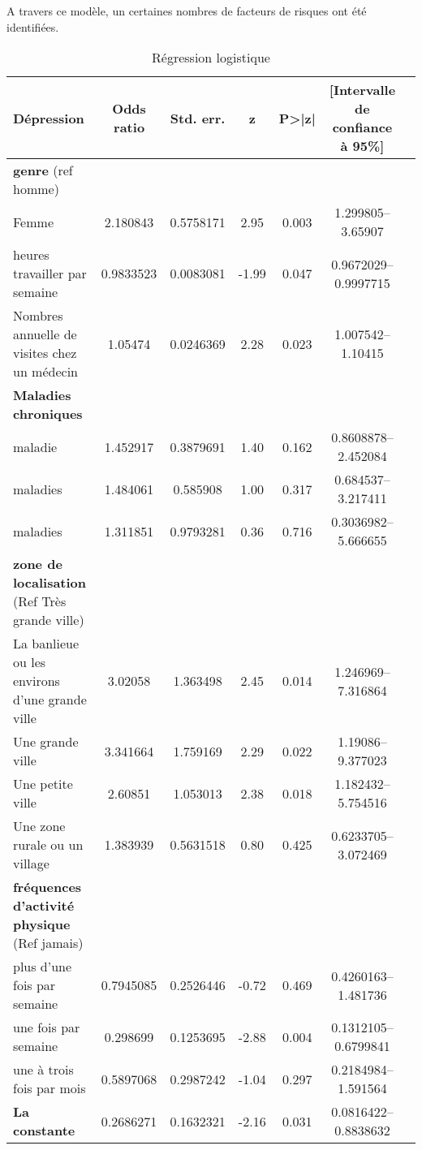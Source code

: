 \documentclass[a4paper]{article}
\begin{document}
A travers ce modèle, un certaines nombres de facteurs de risques ont été identifiées. 
\begin{table}[ht]
	\centering
	\caption{Régression logistique}
	\begin{tabular}{lcccccc}
		\toprule
		\textbf{Dépression} & \textbf{Odds ratio} & \textbf{Std. err.} & \textbf{z} & \textbf{P>|z|} & \textbf{[Intervalle de confiance à 95\%]} \\
		\midrule
		\textbf{genre} (ref homme) & & & & & \\
		\quad Femme & 2.180843 & 0.5758171 & 2.95 & 0.003 & 1.299805--3.65907 \\
		heures travailler par semaine & 0.9833523 & 0.0083081 & -1.99 & 0.047 & 0.9672029--0.9997715 \\
		Nombres annuelle de visites chez un médecin & 1.05474 & 0.0246369 & 2.28 & 0.023 & 1.007542--1.10415 \\
		\textbf{Maladies chroniques} & & & & & \\
		\quad 1 maladie & 1.452917 & 0.3879691 & 1.40 & 0.162 & 0.8608878--2.452084 \\
		\quad 2 maladies & 1.484061 & 0.585908 & 1.00 & 0.317 & 0.684537--3.217411 \\
		\quad 3 maladies & 1.311851 & 0.9793281 & 0.36 & 0.716 & 0.3036982--5.666655 \\
		\textbf{zone de localisation} (Ref Très grande ville) & & & & & \\
		\quad La banlieue ou les environs d'une grande ville & 3.02058 & 1.363498 & 2.45 & 0.014 & 1.246969--7.316864 \\
		\quad Une grande ville & 3.341664 & 1.759169 & 2.29 & 0.022 & 1.19086--9.377023 \\
		\quad Une petite ville & 2.60851 & 1.053013 & 2.38 & 0.018 & 1.182432--5.754516 \\
		\quad Une zone rurale ou un village & 1.383939 & 0.5631518 & 0.80 & 0.425 & 0.6233705--3.072469 \\
		\textbf{fréquences d'activité physique} (Ref jamais) & & & & & \\
		\quad plus d'une fois par semaine & 0.7945085 & 0.2526446 & -0.72 & 0.469 & 0.4260163--1.481736 \\
		\quad une fois par semaine & 0.298699 & 0.1253695 & -2.88 & 0.004 & 0.1312105--0.6799841 \\
		\quad une à trois fois par mois & 0.5897068 & 0.2987242 & -1.04 & 0.297 & 0.2184984--1.591564 \\
		\textbf{La constante} & 0.2686271 & 0.1632321 & -2.16 & 0.031 & 0.0816422--0.8838632 \\
		\bottomrule
	\end{tabular}
\end{table}
\end{document}
